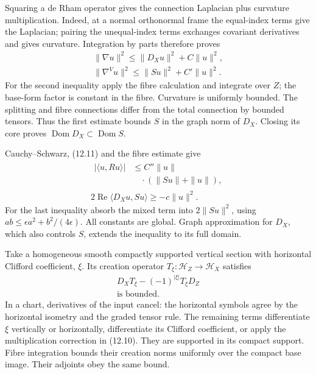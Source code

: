 \documentclass[
  11pt,
]{article}
\begin{document}
Squaring a de Rham operator gives the connection Laplacian plus
curvature multiplication. Indeed, at a normal orthonormal frame the
equal-index terms give the Laplacian; pairing the unequal-index terms
exchanges covariant derivatives and gives curvature. Integration by
parts therefore proves \[
\begin{gathered}
\|\nabla u\|^2\leq\|D_Xu\|^2+C\|u\|^2,\\
\|\nabla^V u\|^2\leq\|Su\|^2+C'\|u\|^2.
\end{gathered}
\tag{12.12}
\] For the second inequality apply the fibre calculation and integrate
over \(Z\); the base-form factor is constant in the fibre. Curvature is
uniformly bounded. The splitting and fibre connections differ from the
total connection by bounded tensors. Thus the first estimate bounds
\(S\) in the graph norm of \(D_X\). Closing its core proves
\(\operatorname{Dom}D_X\subset\operatorname{Dom}S\).

Cauchy--Schwarz, (12.11) and the fibre estimate give \[
\begin{gathered}
\begin{aligned}
|\langle u,Ru\rangle|&\leq C''\|u\|\\
&\quad\cdot(\|Su\|+\|u\|),
\end{aligned}\\
2\operatorname{Re}\langle D_Xu,Su\rangle
\geq-c\|u\|^2.
\end{gathered}
\tag{12.13}
\] For the last inequality absorb the mixed term into \(2\|Su\|^2\),
using \(ab\leq\epsilon a^2+b^2/(4\epsilon)\). All constants are global.
Graph approximation for \(D_X\), which also controls \(S\), extends the
inequality to its full domain.

Take a homogeneous smooth compactly supported vertical section with
horizontal Clifford coefficient, \(\xi\). Its creation operator
\(T_\xi:\mathcal H_Z\to\mathcal H_X\) satisfies \[
\begin{gathered}
D_XT_\xi-(-1)^{|\xi|}T_\xi D_Z\\
\text{is bounded}.
\end{gathered}
\tag{12.14}
\] In a chart, derivatives of the input cancel: the horizontal symbols
agree by the horizontal isometry and the graded tensor rule. The
remaining terms differentiate \(\xi\) vertically or horizontally,
differentiate its Clifford coefficient, or apply the multiplication
correction in (12.10). They are supported in its compact support. Fibre
integration bounds their creation norms uniformly over the compact base
image. Their adjoints obey the same bound.
\end{document}

